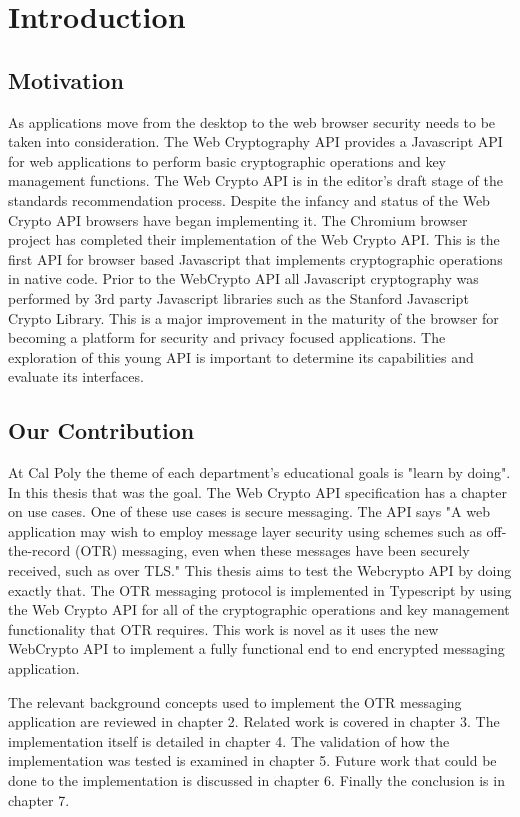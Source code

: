 \chapter{Introduction}


\section{Motivation}


As applications move from the desktop to the web browser security needs to be taken into consideration. The Web Cryptography API provides a Javascript API for web applications to perform basic cryptographic operations and key management functions. The Web Crypto API is in the editor's draft stage of the standards recommendation process.\cite{webcrypto-overview} Despite the infancy and status of the Web Crypto API browsers have began implementing it. The Chromium browser project has completed their implementation of the Web Crypto API.\cite{webcrypto-chromium} This is the first API for browser based Javascript that implements cryptographic operations in native code. Prior to the WebCrypto API all Javascript cryptography was performed by 3rd party Javascript libraries such as the Stanford Javascript Crypto Library.\cite{sjcl-library} This is a major improvement in the maturity of the browser for becoming a platform for security and privacy focused applications. The exploration of this young API is important to determine its capabilities and evaluate its interfaces.


\section{Our Contribution}


At Cal Poly the theme of each department's educational goals is "learn by doing". In this thesis that was the goal. The Web Crypto API specification has a chapter on use cases. One of these use cases is secure messaging. The API says "A web application may wish to employ message layer security using schemes such as off-the-record (OTR) messaging, even when these messages have been securely received, such as over TLS."\cite{webcrypto-overview} This thesis aims to test the Webcrypto API by doing exactly that. The OTR messaging protocol is implemented in Typescript by using the Web Crypto API for all of the cryptographic operations and key management functionality that OTR requires. This work is novel as it uses the new WebCrypto API to implement a fully functional end to end encrypted messaging application.  


The relevant background concepts used to implement the OTR messaging application are reviewed in chapter 2. Related work is covered in chapter 3. The implementation itself is detailed in chapter 4. The validation of how the implementation was tested is examined in chapter 5. Future work that could be done to the implementation is discussed in chapter 6. Finally the conclusion is in chapter 7.
  

